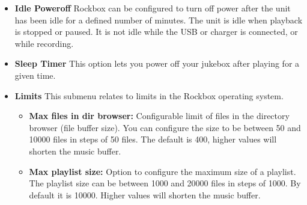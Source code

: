 \begin{itemize}

\item \textbf{\label{ref:idlepoweroff}Idle Poweroff}
  Rockbox can be configured to turn off power after the unit has been idle for a defined number of minutes. The unit is idle when playback is stopped or paused. It is not idle while the USB or charger is connected, or while recording.
  
\item \textbf{Sleep Timer}
  This option lets you power off your jukebox after playing for a given time. 


\item \textbf{Limits}
  This submenu relates to limits in the Rockbox operating system.
  
  \begin{itemize}
  \item \textbf{Max files in dir browser:}
    Configurable limit of files in the directory browser (file buffer size). You can configure the size to be between 50 and 10000 files in steps of 50 files. The default is 400, higher values will shorten the music buffer.\\
  \item \textbf{Max playlist size:}
    Option to configure the maximum size of a playlist. The playlist size can be between 1000 and 20000 files in
    steps of 1000.  By default it is 10000.  Higher values will shorten the music buffer.\\
  \end{itemize}


\end{itemize}

